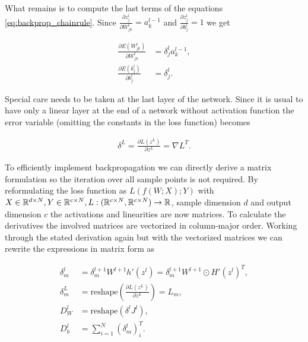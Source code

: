 \documentclass[english,11pt,a4paper]{article}
\begin{document}
What remains is to compute the last terms of the equations \ref{eq:backprop_chainrule}. Since $\frac{\partial z^l_j}{\partial W^l_{jk}} = a^{l-1}_k$ and $\frac{\partial z^l_j}{\partial b_j^l} = 1$ we get

\begin{equation}
	\begin{aligned}
		\frac{\partial E(W_{jk}^l)}{\partial W_{jk}^l} &= \delta^l_j a^{l-1}_k, \\
		\frac{\partial E(b_j^l)}{\partial b_j^l} &= \delta^l_j.
	\end{aligned}
\end{equation}

Special care needs to be taken at the last layer of the network. Since it is usual to have only a linear layer at the end of a network without activation function the error variable (omitting the constants in the loss function) becomes 

\begin{equation}
	\begin{aligned}
		\delta^L = \frac{\partial L(z^L)}{\partial z^L} = \nabla L^T.
	\end{aligned}
\end{equation}

To efficiently implement backpropagation we can directly derive a matrix formulation so the iteration over all sample points is not required. By reformulating the loss function as $L(f(W;X);Y)$ with $X \in \mathbb{R}^{d \times N}, Y \in \mathbb{R}^{c \times N}, L: (\mathbb{R}^{c \times N},\mathbb{R}^{c \times N}) \to \mathbb{R}$, sample dimension $d$ and output dimension $c$ the activations and linearities are now matrices. To calculate the derivatives the involved matrices are vectorized in column-major order. Working through the stated derivation again but with the vectorized matrices we can rewrite the expressions in matrix form as

\begin{equation}
	\begin{aligned}
		\delta^l_m &= \delta^{l+1}_m W^{l+1} h'(z^l) = \delta^{l+1}_m W^{l+1} \odot H'(z^l)^T, \\
		\delta^L_m &= \text{reshape}(\frac{\partial L(z^L)}{\partial z^L}) = L_m, \\
		D_W^l &= \text{reshape}(\delta^l J^l), \\
		D_b^l &= \sum_{i=1}^{N} (\delta^l_m)_{i}^T.
	\end{aligned}
\end{equation}
\end{document}

